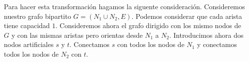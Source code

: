 \documentclass[twoside,12pt]{article}
\begin{document}
Para hacer esta transformación hagamos la siguente consideración. Consideremos nuestro grafo bipartito $G=(N_1\cup N_2,E)$. Podemos considerar que cada arista tiene capacidad $1$. Consideremos ahora el grafo dirigido con los mismo nodos de $G$ y con las mismas aristas pero orientas desde $N_1$ a $N_2$. Introducimos ahora dos nodos artificiales $s$ y $t$. Conectamos $s$ con todos los nodos de $N_1$ y conectamos todos los nodos de $N_2$ con $t$.  

\begin{figure}[htbp]
\centering

\caption{}
\end{figure}
\end{document}
